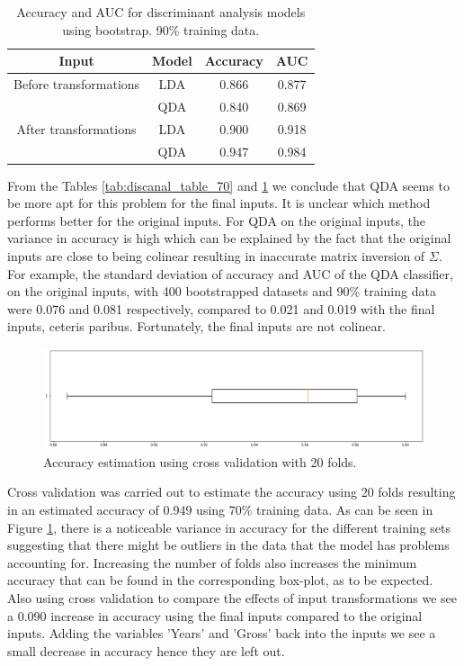 \documentclass[../../project.tex]{subfiles}
\begin{document}
		\begin{table}[h!]
		\centering
			\caption{Accuracy and AUC for discriminant analysis models using bootstrap. 90\% training data.}
		\begin{tabular}{cccc}
		    \toprule
			Input & Model & Accuracy & AUC \\
			\midrule
			Before transformations
			& LDA & 0.866 & 0.877 \\
		    & QDA & 0.840 & 0.869 \\
			\midrule
			After transformations
			& LDA & 0.900 & 0.918 \\
			& QDA & 0.947 & 0.984 \\
			\bottomrule
		\end{tabular}
		\label{tab:discanal_table_90}
	\end{table}
	From the Tables \ref{tab:discanal_table_70} and \ref{tab:discanal_table_90} we conclude that QDA seems to be more apt for this problem for the final inputs. It is unclear which method performs better for the original inputs. For QDA on the original inputs, the variance in accuracy is high which can be explained by the fact that the original inputs are close to being colinear resulting in inaccurate matrix inversion of $\Sigma$. For example, the standard deviation of accuracy and AUC of the QDA classifier, on the original inputs, with 400 bootstrapped datasets and 90\% training data were 0.076 and 0.081 respectively, compared to 0.021 and 0.019 with the final inputs, ceteris paribus. Fortunately, the final inputs are not colinear.
	
	\begin{figure}[ht]
		\centering
    	\includegraphics[width=1\linewidth]{project/tex/QDAboxplot.png}
		\caption{Accuracy estimation using cross validation with 20 folds.}
		\label{fig:boxplotQDA}
    \end{figure}
	
	Cross validation was carried out to estimate the accuracy using 20 folds resulting in an estimated accuracy of 0.949 using 70\% training data. As can be seen in Figure \ref{fig:boxplotQDA}, there is a noticeable variance in accuracy for the different training sets suggesting that there might be outliers in the data that the model has problems accounting for. Increasing the number of folds also increases the minimum accuracy that can be found in the corresponding box-plot, as to be expected. Also using cross validation to compare the effects of input transformations we see a 0.090 increase in accuracy using the final inputs compared to the original inputs. Adding the variables 'Years' and 'Gross' back into the inputs we see a small decrease in accuracy hence they are left out.
\end{document}
